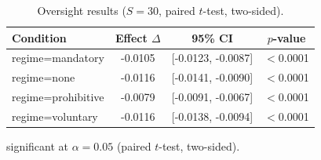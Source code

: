 \begin{table}[t]
  \centering
  \caption{Oversight results ($S=30$, paired $t$-test, two-sided).}
  \label{tab:oversight}
  \begin{tabular}{lccc}
    \toprule
    Condition & Effect $\Delta$ & 95\% CI & $p$-value \\
    \midrule
    regime=mandatory & -0.0105\dag{} & [-0.0123, -0.0087] & $<$0.0001 \\
    regime=none & -0.0116\dag{} & [-0.0141, -0.0090] & $<$0.0001 \\
    regime=prohibitive & -0.0079\dag{} & [-0.0091, -0.0067] & $<$0.0001 \\
    regime=voluntary & -0.0116\dag{} & [-0.0138, -0.0094] & $<$0.0001 \\
    \bottomrule
  \end{tabular}
  \begin{minipage}{\linewidth}
    \vspace{4pt}
    \footnotesize \dag{} significant at $\alpha = 0.05$ (paired $t$-test, two-sided).
  \end{minipage}
\end{table}